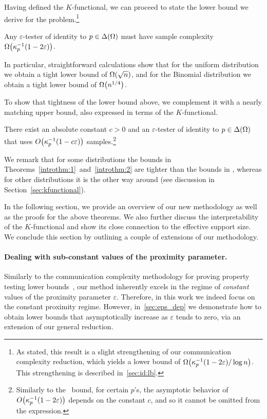 \documentclass[11pt]{article}
\theoremstyle{remark}   	\newtheorem{remark}[theorem]{Remark}
\theoremstyle{definition}   	\newaliascnt{defn}{theorem}
\newcommand{\eps}{\ensuremath{\varepsilon}\xspace}
\newcommand{\bigO}[1]{{O\mleft( #1 \mright)}}
\newcommand{\bigOmega}[1]{{\Omega\mleft( #1 \mright)}}
\newcommand{\kf}[1]{\kappa_{#1}}
\begin{document}
Having defined the $K$-functional, we can proceed to state the lower bound we derive for the problem.\footnote{As stated, this result is a slight strengthening of our communication complexity reduction, which yields a lower bound of $\bigOmega{\kf{p}^{-1}(1-2\eps)/\log n}$. This strengthening is described in~\autoref{sec:id:lb}.}
\begin{theorem}
\label{introthm:1}
Any $\eps$-tester of identity to $p\in\Delta\!\left(\Omega\right)$ must have sample complexity $\bigOmega{\kf{p}^{-1}(1-2\eps)}$.
\end{theorem}
\noindent 
In particular, straightforward calculations show that for the uniform distribution we obtain a tight lower bound of $\bigOmega{\sqrt{n}}$, and for the Binomial distribution we obtain a tight lower bound of $\bigOmega{n^{1/4}}$.

To show that tightness of the lower bound above, we complement it with a nearly matching upper bound, also expressed in terms of the $K$-functional.
\begin{theorem}
\label{introthm:2}
There exist an absolute constant $c>0$ and an $\eps$-tester of identity to $p\in\Delta\!\left(\Omega\right)$ that uses $\bigO{\kf{p}^{-1}(1-c\eps)}$ samples.\footnote{Similarly to the~\cite{VV:14} bound, for certain $p$'s, the asymptotic behavior of $\bigO{\kf{p}^{-1}(1-2\eps)}$ depends on the constant $c$, and so it cannot be omitted from the expression.}
\end{theorem}
\noindent We remark that for some distributions the bounds in Theorems~\ref{introthm:1}~and~\ref{introthm:2} are tighter than the bounds in \cite{VV:14}, whereas for other distributions it is the other way around (see discussion in Section~\ref{sec:kfunctional}).

In the following section, we provide an overview of our new methodology as well as the proofs for the above theorems. We also further discuss the interpretability of the $K$-functional and show its close connection to the effective support size. We conclude this section by outlining a couple of extensions of our methodology.

\paragraph{Dealing with sub-constant values of the proximity parameter.} Similarly to the communication complexity methodology for proving property testing lower bounds~\cite{BBM12}, our method inherently excels in the regime of \emph{constant} values of the proximity parameter $\eps$. Therefore, in this work we indeed focus on the constant proximity regime. However, in~\autoref{sec:eps_dep} we demonstrate how to obtain lower bounds that asymptotically increase as $\eps$ tends to zero, via an extension of our general reduction.
\end{document}
